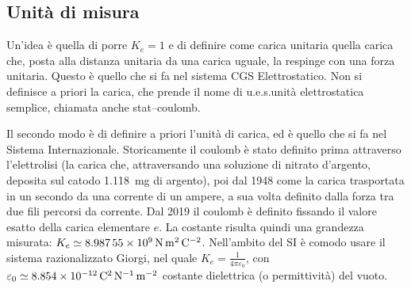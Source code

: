 \subsection{Unità di misura}
Un'idea è quella di porre $K_e=1$ e di definire come carica unitaria quella carica che, posta alla distanza unitaria da una carica uguale, la respinge con una forza unitaria. Questo è quello che si fa nel sistema CGS Elettrostatico. Non si definisce a priori la carica, che prende il nome di u.e.s.\@ unità elettrostatica semplice, chiamata anche stat--coulomb.

Il secondo modo è di definire a priori l'unità di carica, ed è quello che si fa nel Sistema Internazionale. Storicamente il coulomb è stato definito prima attraverso l'elettrolisi (la carica che, attraversando una soluzione di nitrato d'argento, deposita sul catodo \SI{1.118}{\milli\gram} di argento), poi dal 1948 come la carica trasportata in un secondo da una corrente di un ampere, a sua volta definito dalla forza tra due fili percorsi da corrente. Dal 2019 il coulomb è definito fissando il valore esatto della carica elementare $e$. La costante risulta quindi una grandezza misurata: $K_e\simeq \SI{8.98755E9}{\newton\meter\squared\per\coulomb\squared}$. Nell'ambito del SI è comodo usare il sistema razionalizzato Giorgi, nel quale $K_e=\frac{1}{4\pi\varepsilon_0}$, con $\varepsilon_0\simeq \SI{8.854E-12}{\coulomb\squared\per\newton\per\metre\squared}$ costante dielettrica (o permittività) del vuoto.

